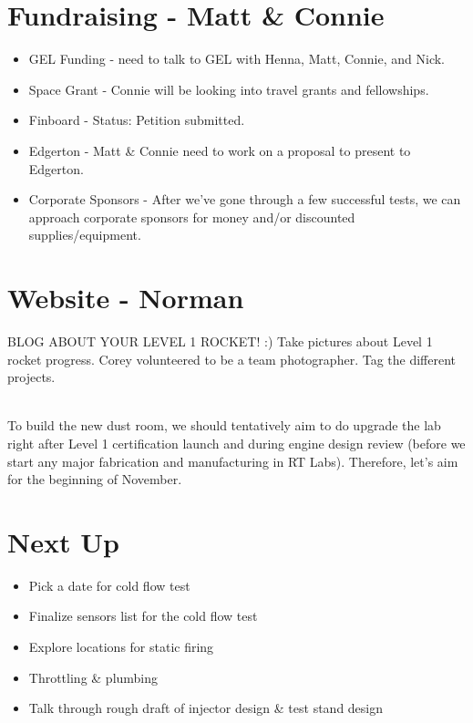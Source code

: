 \documentclass[12pt]{article}
\begin{document}
\section{Fundraising - Matt \& Connie}
\begin{itemize}
\item
GEL Funding - need to talk to GEL with Henna, Matt, Connie, and Nick.
\item
Space Grant - Connie will be looking into travel grants and fellowships.
\item
Finboard - Status: Petition submitted.
\item
Edgerton - Matt \& Connie need to work on a proposal to present to Edgerton.
\item
Corporate Sponsors - After we've gone through a few successful tests, we can approach corporate sponsors for money and/or discounted supplies/equipment.
\end{itemize}

\section{Website - Norman}
BLOG ABOUT YOUR LEVEL 1 ROCKET! :) Take pictures about Level 1 rocket progress. Corey volunteered to be a team photographer. Tag the different projects.

\noindent \\To build the new dust room, we should tentatively aim to do upgrade the lab right after Level 1 certification launch and during engine design review (before we start any major fabrication and manufacturing in RT Labs). Therefore, let's aim for the beginning of November.

\section{Next Up}
\begin{itemize}
\item Pick a date for cold flow test
\item Finalize sensors list for the cold flow test
\item Explore locations for static firing
\item Throttling \& plumbing
\item Talk through rough draft of injector design \& test stand design
\end{itemize}
\end{document}
